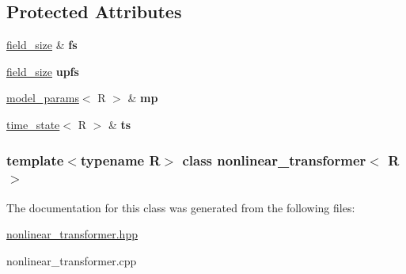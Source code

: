 \subsection*{Protected Attributes}
\begin{DoxyCompactItemize}
\item 
\hypertarget{classnonlinear__transformer_a128ffada9074a7bdc2e3ede63ae98ef1}{
\hyperlink{structfield__size}{field\_\-size} \& {\bfseries fs}}
\label{classnonlinear__transformer_a128ffada9074a7bdc2e3ede63ae98ef1}

\item 
\hypertarget{classnonlinear__transformer_a4444a064e4080b2f76a388d4256e0a28}{
\hyperlink{structfield__size}{field\_\-size} {\bfseries upfs}}
\label{classnonlinear__transformer_a4444a064e4080b2f76a388d4256e0a28}

\item 
\hypertarget{classnonlinear__transformer_a50c4033d9364f08a083817221bbe9ac9}{
\hyperlink{structmodel__params}{model\_\-params}$<$ R $>$ \& {\bfseries mp}}
\label{classnonlinear__transformer_a50c4033d9364f08a083817221bbe9ac9}

\item 
\hypertarget{classnonlinear__transformer_a7ecb8c8f2d4e37e60cbc3431582a6eab}{
\hyperlink{structtime__state}{time\_\-state}$<$ R $>$ \& {\bfseries ts}}
\label{classnonlinear__transformer_a7ecb8c8f2d4e37e60cbc3431582a6eab}

\end{DoxyCompactItemize}
\subsubsection*{template$<$typename R$>$ class nonlinear\_\-transformer$<$ R $>$}



The documentation for this class was generated from the following files:\begin{DoxyCompactItemize}
\item 
\hyperlink{nonlinear__transformer_8hpp}{nonlinear\_\-transformer.hpp}\item 
nonlinear\_\-transformer.cpp\end{DoxyCompactItemize}
